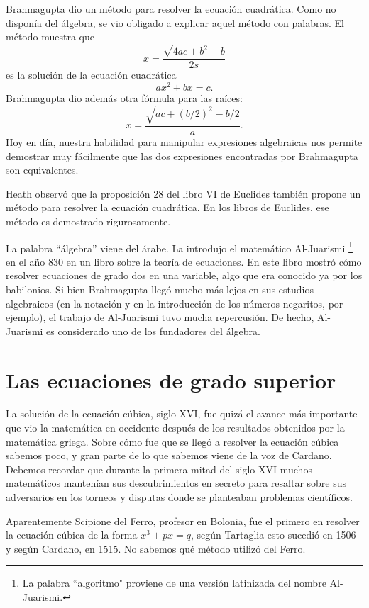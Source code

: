 Brahmagupta dio un método para resolver la ecuación cuadrática. Como no
disponía del álgebra, se vio obligado a explicar 
aquel método con palabras. El
método muestra que 
\[
x=\frac{\sqrt{4ac+b^2}-b}{2s}
\]
es la solución de la ecuación cuadrática 
\[
	ax^2+bx=c.
\]
Brahmagupta dio además otra fórmula para las raíces:
\[
	x=\frac{\sqrt{ac+(b/2)^2}-b/2}{a}.
\]
Hoy en día, nuestra habilidad para manipular expresiones algebraicas nos
permite demostrar muy fácilmente que las dos expresiones encontradas por
Brahmagupta son equivalentes.

Heath observó que la proposición 28 del libro VI de Euclides también propone un
método para resolver la ecuación cuadrática. En los libros de Euclides, 
ese método es demostrado
rigurosamente.


La palabra ``álgebra'' viene del árabe. La introdujo el matemático Al-Juarismi
\footnote{La palabra ``algoritmo" proviene de una versión latinizada del nombre 
Al-Juarismi.} en el año 830 en un libro sobre la teoría de ecuaciones. 
En este libro mostró
cómo resolver ecuaciones de grado dos en una variable, algo que era conocido ya
por los babilonios.  Si bien Brahmagupta llegó mucho más lejos en
sus estudios algebraicos (en la notación y en la introducción de los
números negaritos, por ejemplo), el trabajo de Al-Juarismi tuvo mucha
repercusión. De hecho, Al-Juarismi es considerado uno de los 
fundadores del álgebra. 

\section*{Las ecuaciones de grado superior}

La solución de la ecuación cúbica, siglo XVI, fue quizá el avance más
importante que vio la matemática en occidente después de los resultados
obtenidos por la matemática griega. Sobre cómo fue que se llegó a resolver la
ecuación cúbica sabemos poco, y gran parte de lo que sabemos viene de la voz de
Cardano. Debemos recordar que durante la primera mitad del siglo XVI muchos matemáticos
mantenían sus descubrimientos en secreto para resaltar sobre sus adversarios en
los torneos y disputas donde se planteaban problemas científicos.

Aparentemente Scipione del Ferro, profesor en Bolonia, fue el primero en
resolver la ecuación cúbica de la forma $x^3+px=q$, según Tartaglia esto
sucedió en 1506 y según Cardano, en 1515. No sabemos qué método utilizó del
Ferro. 

